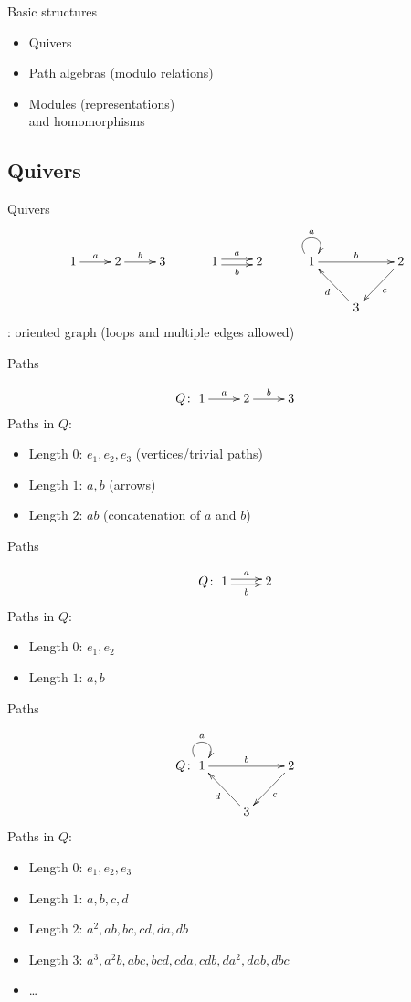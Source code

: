 \begin{frame}{}
\huge Basic structures
\Large
\begin{itemize}
\item Quivers
\item Path algebras (modulo relations)
\item Modules (representations)\\and homomorphisms
\end{itemize}
\end{frame}

\subsection{Quivers}

\begin{frame}{Quivers}
\[
\xymatrix{1\ar[r]^a & 2\ar[r]^b & 3} \qquad\quad
\xymatrix{1\ar@<.5ex>[r]^a\ar@<-.5ex>[r]_b & 2} \qquad\quad
\xymatrix{1\ar@(ul,ur)^a\ar[rr]^b & & 2\ar[dl]^c \\ & 3\ar[ul]^d & }
\]
\pause {}: oriented graph (loops and multiple edges allowed)
\end{frame}

\begin{frame}{Paths}

{\Large
\[
Q \colon \xymatrix{1\ar[r]^a & 2\ar[r]^b & 3}
\]
}
Paths in $Q$:\pause
\begin{itemize}
\item Length $0$: $e_1, e_2, e_3$ (vertices/trivial paths)
\pause
\item Length $1$: $a, b$ (arrows)
\pause
\item Length $2$: $ab$ (concatenation of $a$ and $b$)
\end{itemize}
\end{frame}

\begin{frame}{Paths}

{\Large
\[
Q \colon \xymatrix{1\ar@<.5ex>[r]^a\ar@<-.5ex>[r]_b & 2}
\]
}
Paths in $Q$:\pause
\begin{itemize}
\item Length $0$: $e_1, e_2$
\pause
\item Length $1$: $a, b$
\end{itemize}
\end{frame}

\begin{frame}{Paths}

{\Large
\[
Q \colon \xymatrix{1\ar@(ul,ur)^a\ar[rr]^b & & 2\ar[dl]^c \\ & 3\ar[ul]^d & }
\]
}
Paths in $Q$:\pause
\begin{itemize}
\item Length $0$: $e_1, e_2, e_3$
\pause
\item Length $1$: $a, b, c, d$
\pause
\item Length $2$: $a^2, ab, bc, cd, da, db$
\pause
\item Length $3$: $a^3, a^2b, abc, bcd, cda, cdb, da^2, dab, dbc$
\pause
\item \ldots
\end{itemize}
\end{frame}


